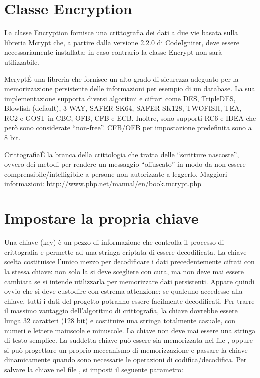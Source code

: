 \section{Classe Encryption}
\label{class:encryption}

La classe Encryption fornisce una crittografia dei dati a due vie basata sulla libreria Mcrypt che, a partire dalla versione 2.2.0 di CodeIgniter, deve essere necessariamente installata; in caso contrario la classe Encrypt non sarà utilizzabile.

\begin{deftabv}{Mcrypt}{\'E una libreria che fornisce un alto grado di sicurezza adeguato per la memorizzazione persistente delle informazioni per esempio di un database. La sua implementazione supporta diversi algoritmi e cifrari come DES, TripleDES, Blowfish (default), 3-WAY, SAFER-SK64, SAFER-SK128, TWOFISH, TEA, RC2 e GOST in CBC, OFB, CFB e ECB. Inoltre, sono supporti RC6 e IDEA che però sono considerate ``non-free''. CFB/OFB per impostazione predefinita sono a 8 bit.}
\end{deftabv}

\begin{deftab}{Crittografia}{\'E la branca della crittologia che tratta delle ``scritture nascoste'', ovvero dei metodi per rendere un messaggio ``offuscato'' in modo da non essere comprensibile/intelligibile a persone non autorizzate a leggerlo. Maggiori informazioni: \url{http://www.php.net/manual/en/book.mcrypt.php}}
\end{deftab}

\section*{Impostare la propria chiave}
Una chiave (key) è un pezzo di informazione che controlla il processo di crittografia e permette ad una stringa criptata di essere decodificata. La chiave scelta costituisce l'unico mezzo per decodificare i dati precedentemente cifrati con la stessa chiave: non solo la si deve scegliere con cura, ma non deve mai essere cambiata se si intende utilizzarla per memorizzare dati persistenti. Appare quindi ovvio che si deve custodire con estrema attenzione: se qualcuno accedesse alla chiave, tutti i dati del progetto potranno essere facilmente decodificati. Per trarre il massimo vantaggio dell'algoritmo di crittografia, la chiave dovrebbe essere lunga 32 caratteri (128 bit) e costituire una stringa totalmente casuale, con numeri e lettere maiuscole e minuscole. La chiave non deve mai essere una stringa di testo semplice. La suddetta chiave può essere sia memorizzata nel file , oppure si può progettare un proprio meccanismo di memorizzazione e passare la chiave dinamicamente quando sono necessarie le operazioni di codifica/decodifica. Per salvare la chiave nel file , si imposti il seguente parametro:

